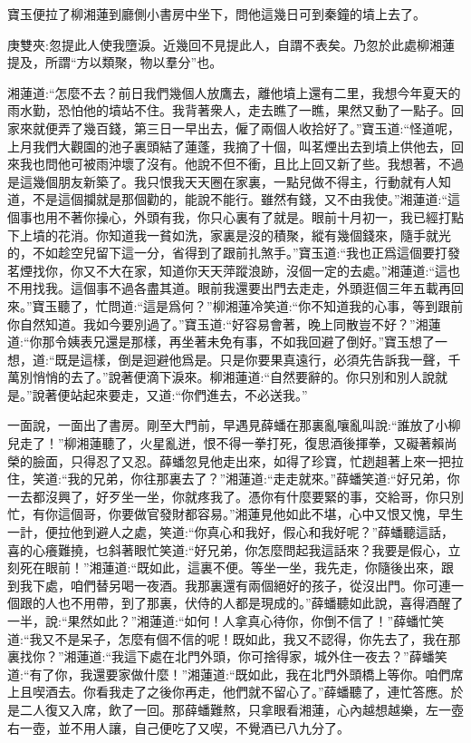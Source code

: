 \begin{parag}
    寶玉便拉了柳湘蓮到廳側小書房中坐下，問他這幾日可到秦鐘的墳上去了。\begin{note}庚雙夾:忽提此人使我墮淚。近幾回不見提此人，自謂不表矣。乃忽於此處柳湘蓮提及，所謂“方以類聚，物以羣分”也。\end{note}湘蓮道:“怎麼不去？前日我們幾個人放鷹去，離他墳上還有二里，我想今年夏天的雨水勤，恐怕他的墳站不住。我背著衆人，走去瞧了一瞧，果然又動了一點子。回家來就便弄了幾百錢，第三日一早出去，僱了兩個人收拾好了。”寶玉道:“怪道呢，上月我們大觀園的池子裏頭結了蓮蓬，我摘了十個，叫茗煙出去到墳上供他去，回來我也問他可被雨沖壞了沒有。他說不但不衝，且比上回又新了些。我想著，不過是這幾個朋友新築了。我只恨我天天圈在家裏，一點兒做不得主，行動就有人知道，不是這個攔就是那個勸的，能說不能行。雖然有錢，又不由我使。”湘蓮道:“這個事也用不著你操心，外頭有我，你只心裏有了就是。眼前十月初一，我已經打點下上墳的花消。你知道我一貧如洗，家裏是沒的積聚，縱有幾個錢來，隨手就光的，不如趁空兒留下這一分，省得到了跟前扎煞手。”寶玉道:“我也正爲這個要打發茗煙找你，你又不大在家，知道你天天萍蹤浪跡，沒個一定的去處。”湘蓮道:“這也不用找我。這個事不過各盡其道。眼前我還要出門去走走，外頭逛個三年五載再回來。”寶玉聽了，忙問道:“這是爲何？”柳湘蓮冷笑道:“你不知道我的心事，等到跟前你自然知道。我如今要別過了。”寶玉道:“好容易會著，晚上同散豈不好？”湘蓮道:“你那令姨表兄還是那樣，再坐著未免有事，不如我回避了倒好。”寶玉想了一想，道:“既是這樣，倒是迴避他爲是。只是你要果真遠行，必須先告訴我一聲，千萬別悄悄的去了。”說著便滴下淚來。柳湘蓮道:“自然要辭的。你只別和別人說就是。”說著便站起來要走，又道:“你們進去，不必送我。”
\end{parag}


\begin{parag}
    一面說，一面出了書房。剛至大門前，早遇見薛蟠在那裏亂嚷亂叫說:“誰放了小柳兒走了！”柳湘蓮聽了，火星亂迸，恨不得一拳打死，復思酒後揮拳，又礙著賴尚榮的臉面，只得忍了又忍。薛蟠忽見他走出來，如得了珍寶，忙趔趄著上來一把拉住，笑道:“我的兄弟，你往那裏去了？”湘蓮道:“走走就來。”薛蟠笑道:“好兄弟，你一去都沒興了，好歹坐一坐，你就疼我了。憑你有什麼要緊的事，交給哥，你只別忙，有你這個哥，你要做官發財都容易。”湘蓮見他如此不堪，心中又恨又愧，早生一計，便拉他到避人之處，笑道:“你真心和我好，假心和我好呢？”薛蟠聽這話，喜的心癢難撓，乜斜著眼忙笑道:“好兄弟，你怎麼問起我這話來？我要是假心，立刻死在眼前！”湘蓮道:“既如此，這裏不便。等坐一坐，我先走，你隨後出來，跟到我下處，咱們替另喝一夜酒。我那裏還有兩個絕好的孩子，從沒出門。你可連一個跟的人也不用帶，到了那裏，伏侍的人都是現成的。”薛蟠聽如此說，喜得酒醒了一半，說:“果然如此？”湘蓮道:“如何！人拿真心待你，你倒不信了！”薛蟠忙笑道:“我又不是呆子，怎麼有個不信的呢！既如此，我又不認得，你先去了，我在那裏找你？”湘蓮道:“我這下處在北門外頭，你可捨得家，城外住一夜去？”薛蟠笑道:“有了你，我還要家做什麼！”湘蓮道:“既如此，我在北門外頭橋上等你。咱們席上且喫酒去。你看我走了之後你再走，他們就不留心了。”薛蟠聽了，連忙答應。於是二人復又入席，飲了一回。那薛蟠難熬，只拿眼看湘蓮，心內越想越樂，左一壺右一壺，並不用人讓，自己便吃了又喫，不覺酒已八九分了。
\end{parag}


